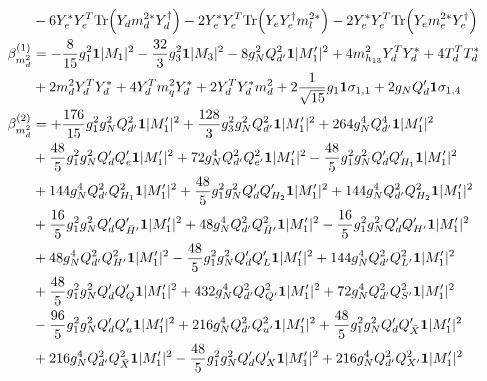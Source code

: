 {\begin{align}
 &-6 {Y_e^*  Y_{e}^{T}} \mbox{Tr}\Big({Y_d  m_d^{2 *}  Y_{d}^{\dagger}}\Big) -2 {Y_e^*  Y_{e}^{T}} \mbox{Tr}\Big({Y_e  Y_{e}^{\dagger}  m_l^{2 *}}\Big) -2 {Y_e^*  Y_{e}^{T}} \mbox{Tr}\Big({Y_e  m_e^{2 *}  Y_{e}^{\dagger}}\Big) \\ 
\beta_{m_d^2}^{(1)} & =  
-\frac{8}{15} g_{1}^{2} {\bf 1} |M_1|^2 -\frac{32}{3} g_{3}^{2} {\bf 1} |M_3|^2 -8 g_{N}^{2} Q_{d'}^{2} {\bf 1} |M_1'|^2 +4 m_{h_{13}}^2 {Y_{d}^{T}  Y_d^*} +4 {T_{d}^{T}  T_d^*} \nonumber \\ 
 &+2 {m_d^2  Y_{d}^{T}  Y_d^*} +4 {Y_{d}^{T}  m_q^2  Y_d^*} +2 {Y_{d}^{T}  Y_d^*  m_d^2} +2 \frac{1}{\sqrt{15}} g_1 {\bf 1} \sigma_{1,1} +2 g_N Q_d' {\bf 1} \sigma_{1,4} \\ 
\beta_{m_d^2}^{(2)} & =  
+\frac{176}{15} g_{1}^{2} g_{N}^{2} Q_{d'}^{2} {\bf 1} |M_1'|^2 +\frac{128}{3} g_{3}^{2} g_{N}^{2} Q_{d'}^{2} {\bf 1} |M_1'|^2 +264 g_{N}^{4} Q_{d'}^{4} {\bf 1} |M_1'|^2 \nonumber \\ 
 &+\frac{48}{5} g_{1}^{2} g_{N}^{2} Q_d' Q_e' {\bf 1} |M_1'|^2 +72 g_{N}^{4} Q_{d'}^{2} Q_{e'}^{2} {\bf 1} |M_1'|^2 -\frac{48}{5} g_{1}^{2} g_{N}^{2} Q_d' Q_{H_1}' {\bf 1} |M_1'|^2 \nonumber \\ 
 &+144 g_{N}^{4} Q_{d'}^{2} Q_{H_1}^{2} {\bf 1} |M_1'|^2 +\frac{48}{5} g_{1}^{2} g_{N}^{2} Q_d' Q_{H_2}' {\bf 1} |M_1'|^2 +144 g_{N}^{4} Q_{d'}^{2} Q_{H_2}^{2} {\bf 1} |M_1'|^2 \nonumber \\ 
 &+\frac{16}{5} g_{1}^{2} g_{N}^{2} Q_d' Q_{\bar{H}'}' {\bf 1} |M_1'|^2 +48 g_{N}^{4} Q_{d'}^{2} Q_{\bar{H}'}^{2} {\bf 1} |M_1'|^2 -\frac{16}{5} g_{1}^{2} g_{N}^{2} Q_d' Q_{H'}' {\bf 1} |M_1'|^2 \nonumber \\ 
 &+48 g_{N}^{4} Q_{d'}^{2} Q_{H'}^{2} {\bf 1} |M_1'|^2 -\frac{48}{5} g_{1}^{2} g_{N}^{2} Q_d' Q_L' {\bf 1} |M_1'|^2 +144 g_{N}^{4} Q_{d'}^{2} Q_{L'}^{2} {\bf 1} |M_1'|^2 \nonumber \\ 
 &+\frac{48}{5} g_{1}^{2} g_{N}^{2} Q_d' Q_Q' {\bf 1} |M_1'|^2 +432 g_{N}^{4} Q_{d'}^{2} Q_{Q'}^{2} {\bf 1} |M_1'|^2 +72 g_{N}^{4} Q_{d'}^{2} Q_{S'}^{2} {\bf 1} |M_1'|^2 \nonumber \\ 
 &-\frac{96}{5} g_{1}^{2} g_{N}^{2} Q_d' Q_u' {\bf 1} |M_1'|^2 +216 g_{N}^{4} Q_{d'}^{2} Q_{u'}^{2} {\bf 1} |M_1'|^2 +\frac{48}{5} g_{1}^{2} g_{N}^{2} Q_d' Q_{\bar{X}}' {\bf 1} |M_1'|^2 \nonumber \\ 
 &+216 g_{N}^{4} Q_{d'}^{2} Q_{\bar{X}}^{2} {\bf 1} |M_1'|^2 -\frac{48}{5} g_{1}^{2} g_{N}^{2} Q_d' Q_X' {\bf 1} |M_1'|^2 +216 g_{N}^{4} Q_{d'}^{2} Q_{X'}^{2} {\bf 1} |M_1'|^2 \nonumber \\ 

\end{align}}
